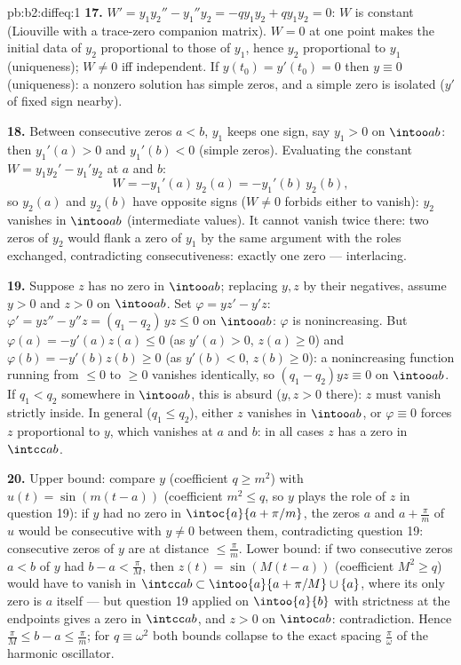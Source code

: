 \begin{solution}{pb:b2:diffeq:1}
\textbf{17.} $W' = y_1y_2'' - y_1''y_2 = -qy_1y_2 + qy_1y_2 =
0$: $W$ is constant (Liouville with a trace-zero companion
matrix). $W = 0$ at one point makes the initial data of $y_2$
proportional to those of $y_1$, hence $y_2$ proportional to
$y_1$ (uniqueness); $W \neq 0$ iff independent. If $y(t_0) =
y'(t_0) = 0$ then $y \equiv 0$ (uniqueness): a nonzero
solution has simple zeros, and a simple zero is isolated
($y'$ of fixed sign nearby).

\textbf{18.} Between consecutive zeros $a < b$, $y_1$ keeps
one sign, say $y_1 > 0$ on $\intoo ab$: then $y_1'(a) > 0$ and
$y_1'(b) < 0$ (simple zeros). Evaluating the constant $W =
y_1y_2' - y_1'y_2$ at $a$ and $b$:
\[
W = -y_1'(a)\,y_2(a) = -y_1'(b)\,y_2(b) ,
\]
so $y_2(a)$ and $y_2(b)$ have opposite signs ($W \neq 0$
forbids either to vanish): $y_2$ vanishes in $\intoo ab$
(intermediate values). It cannot vanish twice there: two zeros
of $y_2$ would flank a zero of $y_1$ by the same argument with
the roles exchanged, contradicting consecutiveness: exactly
one zero --- interlacing.

\textbf{19.} Suppose $z$ has no zero in $\intoo ab$; replacing
$y, z$ by their negatives, assume $y > 0$ and $z > 0$ on
$\intoo ab$. Set $\varphi = yz' - y'z$: $\varphi' = yz'' -
y''z = (q_1 - q_2)\,yz \leq 0$ on $\intoo ab$: $\varphi$ is
nonincreasing. But $\varphi(a) = -y'(a)z(a) \leq 0$ (as
$y'(a) > 0$, $z(a) \geq 0$) and $\varphi(b) = -y'(b)z(b) \geq
0$ (as $y'(b) < 0$, $z(b) \geq 0$): a nonincreasing function
running from $\leq 0$ to $\geq 0$ vanishes identically, so
$(q_1 - q_2)yz \equiv 0$ on $\intoo ab$. If $q_1 < q_2$
somewhere in $\intoo ab$, this is absurd ($y, z > 0$ there):
$z$ must vanish strictly inside. In general ($q_1 \leq q_2$),
either $z$ vanishes in $\intoo ab$, or $\varphi \equiv 0$
forces $z$ proportional to $y$, which vanishes at $a$ and $b$:
in all cases $z$ has a zero in $\intcc ab$.

\textbf{20.} Upper bound: compare $y$ (coefficient $q \geq
m^2$) with $u(t) = \sin(m(t - a))$ (coefficient $m^2 \leq q$,
so $y$ plays the role of $z$ in question 19): if $y$ had no
zero in $\intoc{a}{a + \pi/m}$, the zeros $a$ and $a +
\frac\pi m$ of $u$ would be consecutive with $y \neq 0$
between them, contradicting question 19: consecutive zeros of
$y$ are at distance $\leq \frac\pi m$. Lower bound: if two
consecutive zeros $a < b$ of $y$ had $b - a < \frac\pi M$,
then $z(t) = \sin(M(t-a))$ (coefficient $M^2 \geq q$) would
have to vanish in $\intcc ab \subset \intoo{a}{a + \pi/M}
\cup\{a\}$, where its only zero is $a$ itself --- but
question 19 applied on $\intoo{a}{b}$ with strictness at the
endpoints gives a zero in $\intcc ab$, and $z > 0$ on
$\intoc ab$: contradiction. Hence $\frac\pi M \leq b - a \leq
\frac\pi m$; for $q \equiv \omega^2$ both bounds collapse to
the exact spacing $\frac\pi\omega$ of the harmonic
oscillator.


\end{solution}
